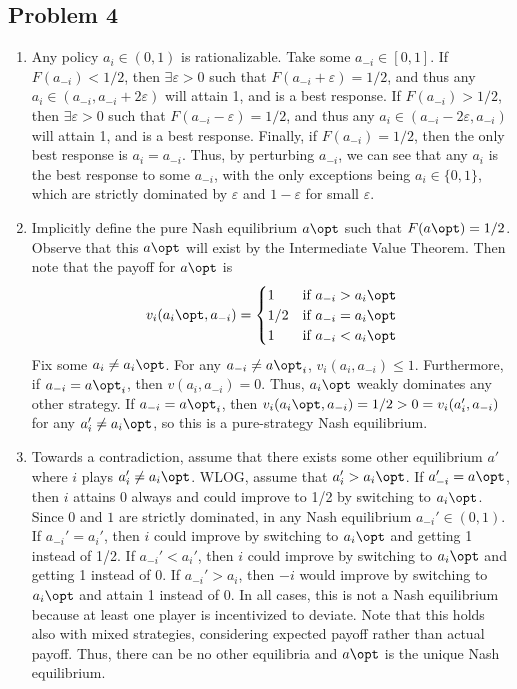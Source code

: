 \documentclass[10pt]{article}
\begin{document}
\subsection*{Problem 4}

\begin{enumerate}
	\item Any policy $a_i \in (0,1)$ is rationalizable. Take some $a_{-i} \in [0,1]$. If $F(a_{-i}) < 1/2$, then $\exists \varepsilon > 0$ such that $F(a_{-i} + \varepsilon) = 1/2$, and thus any $a_i \in (a_{-i},a_{-i} + 2\varepsilon)$ will attain 1, and is a best response. If $F(a_{-i}) > 1/2$, then $\exists \varepsilon > 0$ such that $F(a_{-i} - \varepsilon) = 1/2$, and thus any $a_i \in (a_{-i} - 2\varepsilon,a_{-i})$ will attain 1, and is a best response. Finally, if $F(a_{-i}) = 1/2$, then the only best response is $a_i = a_{-i}$. Thus, by perturbing $a_{-i}$, we can see that any $a_i$ is the best response to some $a_{-i}$, with the only exceptions being $a_i \in \{0,1\}$, which are strictly dominated by $\varepsilon$ and $1-\varepsilon$ for small $\varepsilon$.
	\item Implicitly define the pure Nash equilibrium $a\opt$ such that $F(a\opt) = 1/2$. Observe that this $a\opt$ will exist by the Intermediate Value Theorem. Then note that the payoff for $a\opt$ is \[v_i(a_i\opt,a_{-i}) = \begin{cases} 1 & \text{if } a_{-i} > a_i\opt \\ 1/2 & \text{if } a_{-i} = a_i\opt \\ 1 & \text{if } a_{-i} < a_i\opt \end{cases}\]Fix some $a_i \ne a_i\opt$. For any $a_{-i} \ne a\opt_{i}$, $v_i(a_i,a_{-i}) \le 1$. Furthermore, if $a_{-i} = a\opt_{i}$, then $v(a_i,a_{-i}) = 0$. Thus, $a_i\opt$ weakly dominates any other strategy. If $a_{-i} = a\opt_{i}$, then $v_i(a_i\opt,a_{-i}) = 1/2 > 0 = v_i(a_i',a_{-i})$ for any $a_i' \ne a_i\opt$, so this is a pure-strategy Nash equilibrium.
	\item Towards a contradiction, assume that there exists some other equilibrium $a'$ where $i$ plays $a_i' \ne a_i\opt$. WLOG, assume that $a_i' > a_i\opt$. If $a'_{-i} = a\opt$, then $i$ attains 0 always and could improve to 1/2 by switching to $a_i\opt$. Since $0$ and $1$ are strictly dominated, in any Nash equilibrium $a_{-i}' \in (0,1)$. If $a_{-i}' = a_i'$, then $i$ could improve by switching to $a_i\opt$ and getting 1 instead of 1/2. If $a_{-i}' < a_i'$, then $i$ could improve by switching to $a_i\opt$ and getting 1 instead of 0. If $a_{-i}' > a_i$, then $-i$ would improve by switching to $a_i\opt$ and attain 1 instead of 0. In all cases, this is not a Nash equilibrium because at least one player is incentivized to deviate. Note that this holds also with mixed strategies, considering expected payoff rather than actual payoff. Thus, there can be no other equilibria and $a\opt$ is the unique Nash equilibrium. 
\end{enumerate}
\end{document}

